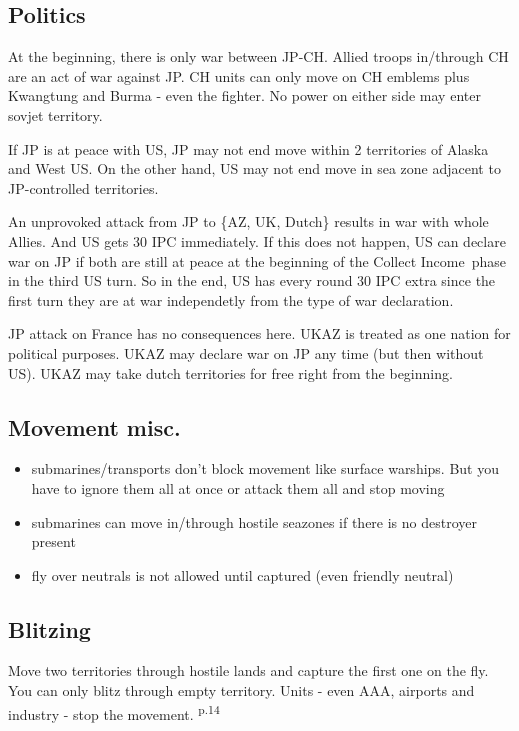 \documentclass[10pt,a4paper,landscape]{article}
\begin{document}
\begin{multicols*}{3}
\subsection*{Politics}
At the beginning, there is only war between JP-CH. Allied troops in/through CH are an act of war against JP. CH units can only move on CH emblems plus Kwangtung and Burma - even the fighter. No power on either side may enter sovjet territory.

If JP is at peace with US, JP may not end move within 2 territories of Alaska and West US. On the other hand, US may not end move in sea zone adjacent to JP-controlled territories. 

An unprovoked attack from JP to \{AZ, UK, Dutch\} results in war with whole Allies. And US gets 30 IPC immediately. If this does not happen, US can declare war on JP if both are still at peace at the beginning of the \glqq Collect Income\grqq\ phase in the third US turn. So in the end, US has every round 30 IPC extra since the first turn they are at war independetly from the type of war declaration.

JP attack on France has no consequences here. UKAZ is treated as one nation for political purposes. UKAZ may declare war on JP any time (but then without US).
UKAZ may take dutch territories for free right from the beginning.

\subsection*{Movement misc.}
\begin{itemize}
\item submarines/transports don't block movement like surface warships. But you have to ignore them all at once or attack them all and stop moving
\item submarines can move in/through hostile seazones if there is no destroyer present
\item fly over neutrals is not allowed until captured (even friendly neutral)
\end{itemize}

\subsection*{Blitzing}
Move two territories through hostile lands and capture the first one on the fly. You can only blitz through empty territory. Units - even AAA, airports and industry - stop the movement. \textsuperscript{p.14}


\end{multicols*}
\end{document}
